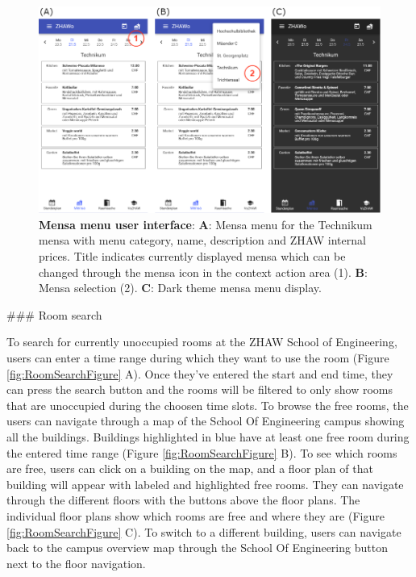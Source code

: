 \begin{markdown}
\begin{figure}[H]
  \includegraphics[width=16cm, center]{./figures/menu_figure.png}
  \captionsetup{width=15.5cm}
  \caption[Mensa menu user interface]{\textbf{Mensa menu user interface}: \textbf{A}: Mensa menu for the Technikum mensa with menu category, name, description and ZHAW internal prices. Title indicates currently displayed mensa which can be changed through the mensa icon in the context action area (1). \textbf{B}: Mensa selection (2). \textbf{C}: Dark theme mensa menu display.}
  \label{fig:MenuFigure}
\end{figure}

### Room search

To search for currently unoccupied rooms at the ZHAW School of Engineering, users can enter a time range during which they want to use the room (Figure \ref{fig:RoomSearchFigure} A). Once they've entered the start and end time, they can press the search button and the rooms will be filtered to only show rooms that are unoccupied during the choosen time slots. To browse the free rooms, the users can navigate through a map of the School Of Engineering campus showing all the buildings. Buildings highlighted in blue have at least one free room during the entered time range (Figure \ref{fig:RoomSearchFigure} B). To see which rooms are free, users can click on a building on the map, and a floor plan of that building will appear with labeled and highlighted free rooms. They can navigate through the different floors with the buttons above the floor plans. The individual floor plans show which rooms are free and where they are (Figure \ref{fig:RoomSearchFigure} C). To switch to a different building, users can navigate back to the campus overview map through the School Of Engineering button next to the floor navigation.


\end{markdown}
